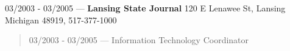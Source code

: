 03/2003 - 03/2005 --- {\bf Lansing State Journal} 120 E Lenawee St, Lansing Michigan 48919, 517-377-1000
\begin{quote}
03/2003 - 03/2005 --- Information Technology Coordinator\\
\end{quote}
